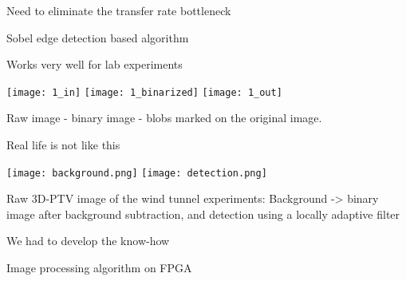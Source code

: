 \begin{frame}[label=real-6]{Need to eliminate the transfer rate bottleneck}
\begin{multicols}{2}
\end{multicols}
\end{frame}

\begin{frame}[label=real-7]{Sobel edge detection based algorithm}
\centering
{}
\end{frame}


\begin{frame}[label=real-8]{Works very well for lab experiments}
\begin{card}
\centering
\texttt{[image: 1\_in]}
\texttt{[image: 1\_binarized]}
\texttt{[image: 1\_out]}
\end{card}
\vspace{-.5cm}
\begin{cardTiny}
Raw image - binary image - blobs marked on the original image.  
\end{cardTiny}
\end{frame}


\begin{frame}[label=real-13]{Real life is not like this}
\begin{multicols}{2}
\texttt{[image: background.png]}
\texttt{[image: detection.png]}
\end{multicols}
\begin{cardTiny}
Raw 3D-PTV image of the wind tunnel experiments: Background ->  binary image after background subtraction, and detection using a locally adaptive filter
\end{cardTiny}
\end{frame}

\begin{frame}[label=real-12]{We had to develop the know-how}
\centering{}
\end{frame}


\begin{frame}[label=real-11]{Image processing algorithm on FPGA}
\centering{}
\end{frame}

